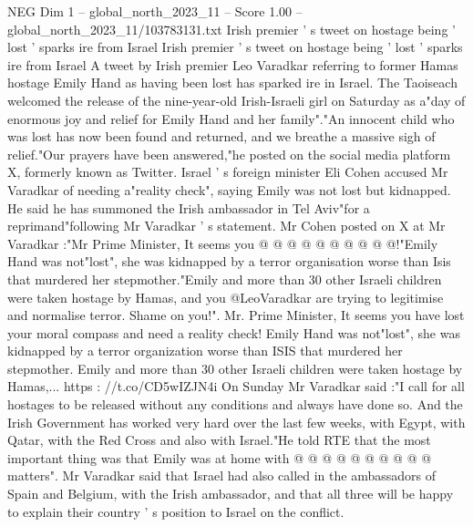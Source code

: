 \begin{textsample}{NEG Dim 1 – global\_north\_2023\_11 – Score 1.00 – global\_north\_2023\_11/103783131.txt}  \label{ex:f1_neg_198}
Irish premier ' s tweet on hostage being ' lost ' sparks ire from Israel Irish premier ' s tweet on hostage being ' lost ' sparks ire from Israel A tweet by Irish premier Leo Varadkar referring to former Hamas hostage Emily Hand as having been lost has sparked ire in Israel.
The Taoiseach welcomed the release of the nine-year-old Irish-Israeli girl on Saturday as a"day of enormous joy and relief for Emily Hand and her family"."An innocent child who was lost has now been found and returned, and we breathe a massive sigh of relief."Our prayers have been answered,"he posted on the social media platform X, formerly known as Twitter.
Israel ' s foreign minister Eli Cohen accused Mr Varadkar of needing a"reality check", saying Emily was not lost but kidnapped.
He said he has summoned the Irish ambassador in Tel Aviv"for a reprimand"following Mr Varadkar ' s statement.
Mr Cohen posted on X at Mr Varadkar :"Mr Prime Minister, It seems you @ @ @ @ @ @ @ @ @ @!"Emily Hand was not"lost", she was kidnapped by a terror organisation worse than Isis that murdered her stepmother."Emily and more than 30 other Israeli children were taken hostage by Hamas, and you @LeoVaradkar are trying to legitimise and normalise terror.
Shame on you!".
Mr.
Prime Minister, It seems you have lost your moral compass and need a reality check!
Emily Hand was not"lost", she was kidnapped by a terror organization worse than ISIS that murdered her stepmother.
Emily and more than 30 other Israeli children were taken hostage by Hamas,... https : //t.co/CD5wIZJN4i On Sunday Mr Varadkar said :"I call for all hostages to be released without any conditions and always have done so.
And the Irish Government has worked very hard over the last few weeks, with Egypt, with Qatar, with the Red Cross and also with Israel."He told RTE that the most important thing was that Emily was at home with @ @ @ @ @ @ @ @ @ @ matters".
Mr Varadkar said that Israel had also called in the ambassadors of Spain and Belgium, with the Irish ambassador, and that all three will be happy to explain their country ' s position to Israel on the conflict.

\end{textsample}
